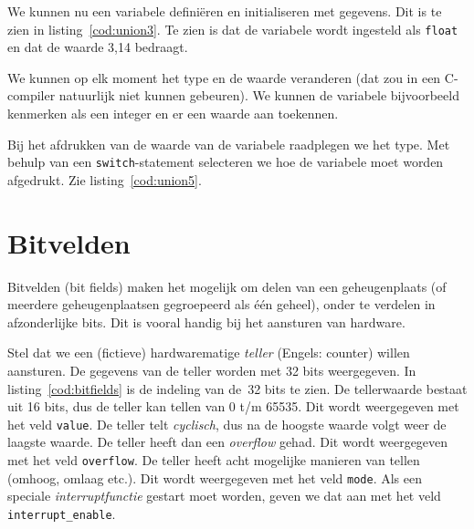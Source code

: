 We kunnen nu een variabele definiëren en initialiseren met gegevens. Dit is te zien in listing~\ref{cod:union3}. Te zien is dat de variabele wordt ingesteld als \texttt{float} en dat de waarde 3,14 bedraagt.


We kunnen op elk moment het type en de waarde veranderen (dat zou in een C-compiler natuurlijk niet kunnen gebeuren). We kunnen de variabele bijvoorbeeld kenmerken als een integer en er een waarde aan toekennen.


Bij het afdrukken van de waarde van de variabele raadplegen we het type. Met behulp van een \texttt{switch}-statement selecteren we hoe de variabele moet worden afgedrukt. Zie listing~\ref{cod:union5}.



\section{Bitvelden}
Bitvelden (bit fields) maken het mogelijk om delen van een geheugenplaats (of meerdere geheugenplaatsen gegroepeerd als één geheel), onder te verdelen in afzonderlijke bits. Dit is vooral handig bij het aansturen van hardware.

Stel dat we een (fictieve) hardwarematige \textsl{teller} (Engels: counter) willen aansturen. De gegevens van de teller worden met 32 bits weergegeven. In listing~\ref{cod:bitfields} is de indeling van de~32 bits te zien. De tellerwaarde bestaat uit 16 bits, dus de teller kan tellen van 0 t/m 65535. Dit wordt weergegeven met het veld \texttt{value}. De teller telt \textsl{cyclisch}, dus na de hoogste waarde volgt weer de laagste waarde. De teller heeft dan een \textsl{overflow} gehad. Dit wordt weergegeven met het veld \texttt{overflow}. De teller heeft acht mogelijke manieren van tellen (omhoog, omlaag etc.). Dit wordt weergegeven met het veld \texttt{mode}. Als een speciale \textsl{interruptfunctie} gestart moet worden, geven we dat aan met het veld \texttt{interrupt\_enable}.

